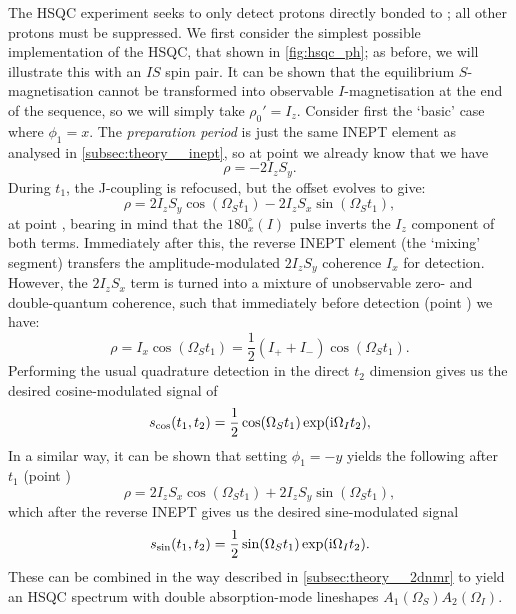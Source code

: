 The HSQC experiment seeks to only detect protons directly bonded to \carbon{}; all other protons must be suppressed.
We first consider the simplest possible implementation of the HSQC, that shown in \cref{fig:hsqc_ph}; as before, we will illustrate this with an $IS$ spin pair.
It can be shown that the equilibrium $S$-magnetisation cannot be transformed into observable $I$-magnetisation at the end of the sequence, so we will simply take $\rho_0' = I_z$.
Consider first the `basic' case where $\phi_1 = x$.
The \textit{preparation period} is just the same INEPT element as analysed in \cref{subsec:theory__inept}, so at point  we already know that we have
\begin{equation}
    \label{eq:hsqc_ph_rho_1}
    \rho = -2I_zS_y.
\end{equation}
During $t_1$, the J-coupling is refocused, but the offset evolves to give:
\begin{equation}
    \label{eq:hsqc_ph_after_t1}
    \rho = 2I_zS_y\cos(\Omega_S t_1) - 2I_zS_x \sin(\Omega_S t_1),
\end{equation}
at point , bearing in mind that the $180^\circ_x(I)$ pulse inverts the $I_z$ component of both terms.
Immediately after this, the reverse INEPT element (the `mixing' segment) transfers the amplitude-modulated $2I_zS_y$ coherence $I_x$ for detection.
However, the $2I_zS_x$ term is turned into a mixture of unobservable zero- and double-quantum coherence, such that immediately before detection (point ) we have:
\begin{equation}
    \label{eq:hsqc_ph_detection}
    \rho = I_x\cos(\Omega_S t_1) = \frac{1}{2}(I_+ + I_-)\cos(\Omega_S t_1).
\end{equation}
Performing the usual quadrature detection in the direct $t_2$ dimension gives us the desired cosine-modulated signal of
\begin{equation}
    \label{eq:hsqc_cos_signal}
    s_\text{cos}(t_1, t_2) = \frac{1}{2}\cos(\Omega_S t_1)\exp(\mathrm{i} \Omega_I t_2),
\end{equation}
In a similar way, it can be shown that setting $\phi_1 = -y$ yields the following after $t_1$ (point )
\begin{equation}
    \label{eq:hsqc_ph_after_t1_sin}
    \rho = 2I_zS_x\cos(\Omega_S t_1) + 2I_zS_y \sin(\Omega_S t_1),
\end{equation}
which after the reverse INEPT gives us the desired sine-modulated signal
\begin{equation}
    \label{eq:hsqc_sin_signal}
    s_\text{sin}(t_1, t_2) = \frac{1}{2}\sin(\Omega_S t_1)\exp(\mathrm{i} \Omega_I t_2).
\end{equation}
These can be combined in the way described in \cref{subsec:theory__2dnmr} to yield an HSQC spectrum with double absorption-mode lineshapes $A_1(\Omega_S)A_2(\Omega_I)$.

